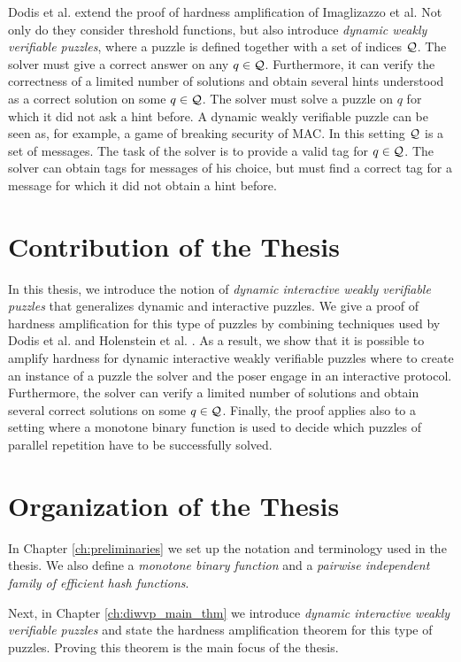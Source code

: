 Dodis et al. \cite{dodis2009security} extend the proof of hardness amplification of Imaglizazzo et al.
Not only do they consider threshold functions, but also introduce \textit{dynamic weakly verifiable puzzles}, where a puzzle is defined together with a set of indices $\mathcal{Q}$.
The solver must give a correct answer on any $q \in \mathcal{Q}$. Furthermore, it can verify the correctness of a limited number of solutions and
obtain several hints understood as a correct solution on some $q \in \mathcal{Q}$. The solver must solve a puzzle on $q$ for which it did not ask a hint before.
A dynamic weakly verifiable puzzle can be seen as, for example, a game of breaking security of MAC.
In this setting $\mathcal{Q}$ is a set of messages. The task of the solver is to provide a valid tag for $q \in \mathcal{Q}$.
The solver can obtain tags for messages of his choice, but must find a correct tag for a message for which it did not obtain a hint before.

\section{Contribution of the Thesis}
In this thesis, we introduce the notion of \textit{dynamic interactive weakly verifiable puzzles} that generalizes dynamic and interactive puzzles.
We give a proof of hardness amplification for this type of puzzles by combining techniques
used by Dodis et al. \cite{dodis2009security} and Holenstein et al. \cite{holenstein2011general}.
As a result, we show that it is possible to amplify hardness for dynamic interactive weakly verifiable puzzles where
to create an instance of a puzzle the solver and the poser engage in an interactive protocol.
Furthermore, the solver can verify a limited number of solutions and obtain several correct solutions on some $q \in \mathcal{Q}$.
Finally, the proof applies also to a setting where a monotone binary function is used to decide which puzzles of parallel repetition
have to be successfully solved.
%
\section{Organization of the Thesis}
In Chapter \ref{ch:preliminaries} we set up the notation and terminology used in the thesis.
We also define a \textit{monotone binary function} and a \textit{pairwise independent family of efficient hash functions}.

Next, in Chapter \ref{ch:diwvp_main_thm} we introduce \textit{dynamic interactive weakly verifiable
puzzles} and state the hardness amplification theorem for this type of puzzles.
Proving this theorem is the main focus of the thesis.

